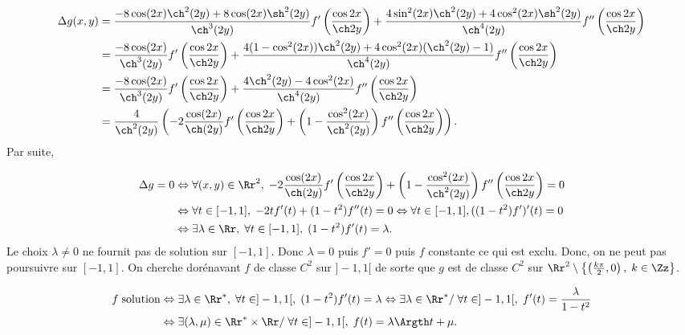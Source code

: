 {{\begin{align*}\ensuremath
\Delta g(x,y)&=\frac{-8\cos(2x)\ch^2(2y)+8\cos(2x)\sh^2(2y)}{\ch^3(2y)}f'\left(\frac{\cos2x}{\ch2y}\right)+\frac{4\sin^2(2x)\ch^2(2y)+4\cos^2(2x)\sh^2(2y)}{\ch^4(2y)}f''\left(\frac{\cos2x}{\ch2y}\right)\\
 &=\frac{-8\cos(2x)}{\ch^3(2y)}f'\left(\frac{\cos2x}{\ch2y}\right)+\frac{4(1-\cos^2(2x))\ch^2(2y)+4\cos^2(2x)(\ch^2(2y)-1)}{\ch^4(2y)}f''\left(\frac{\cos2x}{\ch2y}\right)\\
 &=\frac{-8\cos(2x)}{\ch^3(2y)}f'\left(\frac{\cos2x}{\ch2y}\right)+\frac{4\ch^2(2y)-4\cos^2(2x)}{\ch^4(2y)}f''\left(\frac{\cos2x}{\ch2y}\right)\\
 &=\frac{4}{\ch^2(2y)}\left(-2\frac{\cos(2x)}{\ch(2y)}f'\left(\frac{\cos2x}{\ch2y}\right)+\left(1-\frac{\cos^2(2x)}{\ch^2(2y)}\right)f''\left(\frac{\cos2x}{\ch2y}\right)\right).
\end{align*}
Par suite,

\begin{align*}\ensuremath
\Delta g=0&\Leftrightarrow\forall(x,y)\in\Rr^2,\;-2\frac{\cos(2x)}{\ch(2y)}f'\left(\frac{\cos2x}{\ch2y}\right)+\left(1-\frac{\cos^2(2x)}{\ch^2(2y)}\right)f''\left(\frac{\cos2x}{\ch2y}\right)=0\\
 &\Leftrightarrow\forall t\in[-1,1],\;-2tf'(t)+(1-t^2)f''(t)=0\Leftrightarrow\forall t\in[-1,1],((1-t^2)f')'(t)=0\\
 &\Leftrightarrow\exists \lambda\in\Rr,\;\forall t\in[-1,1],\;(1-t^2)f'(t)=\lambda.
\end{align*}
Le choix $\lambda\neq0$ ne fournit pas de solution sur $[-1,1]$. Donc $\lambda=0$ puis $f'=0$ puis $f$ constante ce qui est exclu. Donc, on ne peut pas poursuivre sur $[-1,1]$.
On cherche dorénavant $f$ de classe $C^2$ sur $]-1,1[$ de sorte que $g$ est de classe $C^2$ sur $\Rr^2\setminus\left\{\left(\frac{k\pi}{2},0\right),\;k\in\Zz\right\}$.

\begin{align*}\ensuremath
f\;\text{solution}&\Leftrightarrow\exists \lambda\in\Rr^*,\;\forall t\in]-1,1[,\;(1-t^2)f'(t)=\lambda\Leftrightarrow\exists \lambda\in\Rr^*/\;\forall t\in]-1,1[,\;f'(t)=\frac{\lambda}{1-t^2}\\
 &\Leftrightarrow\exists(\lambda,\mu)\in\Rr^*\times\Rr/\;\forall t\in]-1,1[,\;f(t)=\lambda\Argth t+\mu.
\end{align*}
}
}
